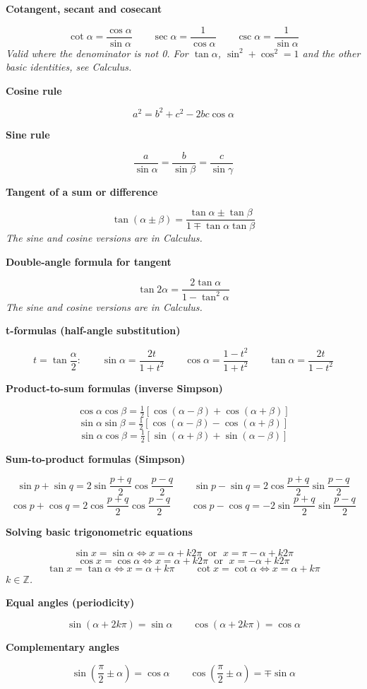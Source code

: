 \documentclass[11pt]{article}
\newcommand{\sub}[1]{\par\medskip\textbf{#1}\par}
\newcommand{\expl}[1]{{\color{gray}\itshape #1}\par}
\begin{document}
\sub{Cotangent, secant and cosecant}
\[ \cot\alpha = \frac{\cos\alpha}{\sin\alpha} \qquad \sec\alpha = \frac{1}{\cos\alpha} \qquad \csc\alpha = \frac{1}{\sin\alpha} \]
\expl{Valid where the denominator is not 0. For $\tan\alpha$, $\sin^2 + \cos^2 = 1$ and the other basic identities, see Calculus.}

\sub{Cosine rule}
\[ a^2 = b^2 + c^2 - 2bc\cos\alpha \]

\sub{Sine rule}
\[ \frac{a}{\sin\alpha} = \frac{b}{\sin\beta} = \frac{c}{\sin\gamma} \]

\sub{Tangent of a sum or difference}
\[ \tan(\alpha \pm \beta) = \frac{\tan\alpha \pm \tan\beta}{1 \mp \tan\alpha\tan\beta} \]
\expl{The sine and cosine versions are in Calculus.}

\sub{Double-angle formula for tangent}
\[ \tan 2\alpha = \frac{2\tan\alpha}{1 - \tan^2\alpha} \]
\expl{The sine and cosine versions are in Calculus.}

\sub{t-formulas (half-angle substitution)}
\[ t = \tan\frac{\alpha}{2}: \qquad \sin\alpha = \frac{2t}{1 + t^2} \qquad \cos\alpha = \frac{1 - t^2}{1 + t^2} \qquad \tan\alpha = \frac{2t}{1 - t^2} \]

\sub{Product-to-sum formulas (inverse Simpson)}
\[ \cos\alpha\cos\beta = \tfrac{1}{2}\left[\cos(\alpha - \beta) + \cos(\alpha + \beta)\right] \]
\[ \sin\alpha\sin\beta = \tfrac{1}{2}\left[\cos(\alpha - \beta) - \cos(\alpha + \beta)\right] \]
\[ \sin\alpha\cos\beta = \tfrac{1}{2}\left[\sin(\alpha + \beta) + \sin(\alpha - \beta)\right] \]

\sub{Sum-to-product formulas (Simpson)}
\[ \sin p + \sin q = 2\sin\frac{p+q}{2}\cos\frac{p-q}{2} \qquad \sin p - \sin q = 2\cos\frac{p+q}{2}\sin\frac{p-q}{2} \]
\[ \cos p + \cos q = 2\cos\frac{p+q}{2}\cos\frac{p-q}{2} \qquad \cos p - \cos q = -2\sin\frac{p+q}{2}\sin\frac{p-q}{2} \]

\sub{Solving basic trigonometric equations}
\[ \sin x = \sin\alpha \iff x = \alpha + k2\pi \;\text{ or }\; x = \pi - \alpha + k2\pi \]
\[ \cos x = \cos\alpha \iff x = \alpha + k2\pi \;\text{ or }\; x = -\alpha + k2\pi \]
\[ \tan x = \tan\alpha \iff x = \alpha + k\pi \qquad \cot x = \cot\alpha \iff x = \alpha + k\pi \]
\expl{$k \in \mathbb{Z}$.}

\sub{Equal angles (periodicity)}
\[ \sin(\alpha + 2k\pi) = \sin\alpha \qquad \cos(\alpha + 2k\pi) = \cos\alpha \]

\sub{Complementary angles}
\[ \sin\left(\frac{\pi}{2} \pm \alpha\right) = \cos\alpha \qquad \cos\left(\frac{\pi}{2} \pm \alpha\right) = \mp\sin\alpha \]
\end{document}
